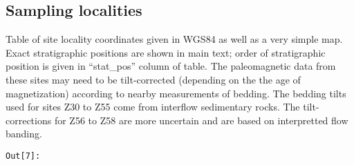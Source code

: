 \documentclass[11pt]{article}
\begin{document}
    \subsection{Sampling localities}\label{sampling-localities}

    Table of site locality coordinates given in WGS84 as well as a very
simple map. Exact stratigraphic positions are shown in main text; order
of stratigraphic position is given in ``stat\_pos'' column of table. The
paleomagnetic data from these sites may need to be tilt-corrected
(depending on the the age of magnetization) according to nearby
measurements of bedding. The bedding tilts used for sites Z30 to Z55
come from interflow sedimentary rocks. The tilt-corrections for Z56 to
Z58 are more uncertain and are based on interpretted flow banding.

\texttt{\color{outcolor}Out[{\color{outcolor}7}]:}
    
\end{document}
